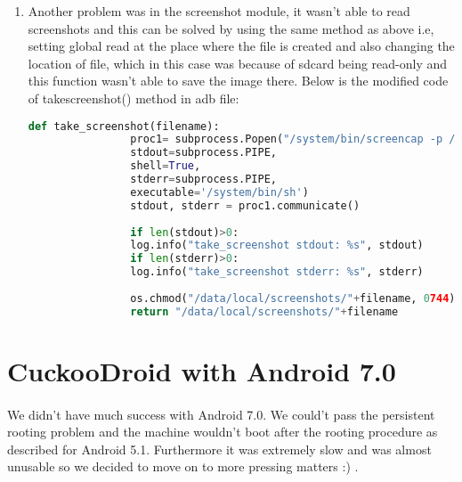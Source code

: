 \documentclass[../main.tex]{subfile}
\begin{document}
\begin{enumerate}
\begin{lstlisting}[language=python]
			# Parse the analysis configuration file generated by the agent.
			self.config = Config(cfg="analysis.conf")
			
			# We update the target according to its category. If it's a file, then
			# we store the path.
			if self.config.category == "file":
			self.target = os.path.join("/data/local/tmp", str(self.config.file_name))
			shutil.copyfile("config/hooks.json", "/data/local/tmp/hooks.json")
			os.chmod("/data/local/tmp/hooks.json", 0754) # Give set global read flag on hooks.json
			# If it's a URL, well.. we store the URL.
			else:
			self.target = self.config.target
		\end{lstlisting}
		
		\item Another problem was in the screenshot module, it wasn't able to read screenshots and this can be solved by using the same method as above i.e, setting global read at the place where the file is created and also changing the location of file, which in this case was because of sdcard being read-only and this function wasn't able to save the image there. Below is the modified code of take\textunderscore screenshot() method in adb file:
		\begin{lstlisting}[language=python]
			def take_screenshot(filename):
				proc1= subprocess.Popen("/system/bin/screencap -p /data/local/screenshots/"+filename, # "/data/local/screenshots/" Fix for /sdcard read only
				stdout=subprocess.PIPE,
				shell=True,
				stderr=subprocess.PIPE,
				executable='/system/bin/sh')
				stdout, stderr = proc1.communicate()
				
				if len(stdout)>0:
				log.info("take_screenshot stdout: %s", stdout)
				if len(stderr)>0:
				log.info("take_screenshot stderr: %s", stderr)
				
				os.chmod("/data/local/screenshots/"+filename, 0744)
				return "/data/local/screenshots/"+filename
		\end{lstlisting}
		
		\end{enumerate}
		
		\section{CuckooDroid with Android 7.0}
		\paragraph{} We didn't have much success with Android 7.0. We could't pass the persistent rooting problem and the machine wouldn't boot after the rooting procedure as described for Android 5.1. Furthermore it was extremely slow and was almost unusable so we decided to move on to more pressing matters :) .
		
\end{document}
